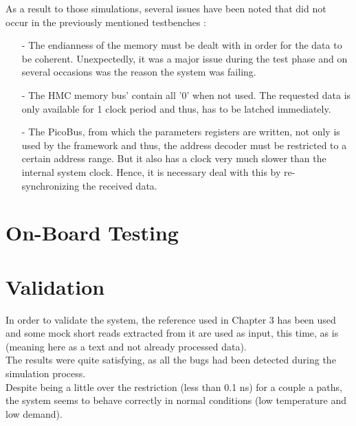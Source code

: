 As a result to those simulations, several issues have been noted that did not occur in the previously mentioned testbenches :
\begin{itemize}
    \item [-] The endianness of the memory must be dealt with in order for the data to be coherent. Unexpectedly, it was a major issue during the test phase and on several occasions was the reason the system was failing.
    \item [-] The HMC memory bus' contain all '0' when not used. The requested data is only available for 1 clock period and thus, has to be latched immediately.
    \item [-] The PicoBus, from which the parameters registers are written, not only is used by the framework and thus, the address decoder must be restricted to a certain address range. But it also has a clock very much slower than the internal system clock. Hence, it is necessary deal with this by re-synchronizing the received data.
\end{itemize}

\section{On-Board Testing}

\section{Validation}

In order to validate the system, the reference used in Chapter 3 has been used and some mock short reads extracted from it are used as input, this time, as is (meaning here as a text and not already processed data). \\

The results were quite satisfying, as all the bugs had been detected during the simulation process. \\

Despite being a little over the restriction (less than 0.1 ns) for a couple a paths, the system seems to behave correctly in normal conditions (low temperature and low demand).
